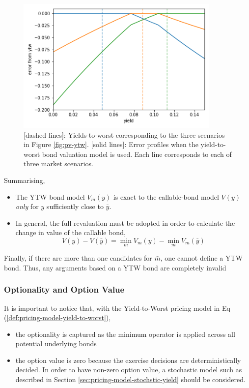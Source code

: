 \documentclass[10pt,a4paper]{article}
\begin{document}
\begin{figure}[h!]
	\begin{center}
		\includegraphics[width=10cm]{pics/error-profile-ytw.png}
	\end{center}
	\caption{
		[dashed lines]: Yields-to-worst corresponding to the three scenarios in Figure \ref{fig:pv-ytw}. 
		[solid lines]: Error profiles when the yield-to-worst bond valuation model is used. Each line corresponds to each of three market scenarios.}
	\label{fig:error-ytw}
\end{figure}


Summarising, 
\begin{itemize}
	\item The YTW bond model $V_{\bar{m}}(y)$ is exact to the callable-bond model $V(y)$ {\em only} for $y$ sufficiently close to $\bar{y}$.
	\item In general, the full revaluation must be adopted in order to calculate the change in value of the callable bond, 
	\begin{equation}
	V(y) - V(\bar{y}) = \min_m V_m(y) - \min_m V_m(\bar{y})
	\end{equation}
\end{itemize}
Finally, if there are more than one candidates for $\bar{m}$, one cannot define a YTW bond. Thus, any arguments based on a YTW bond are completely invalid 

\subsubsection{Optionality and Option Value}

It is important to notice that, with the Yield-to-Worst pricing model in Eq (\ref{def:pricing-model-yield-to-worst}), 
\begin{itemize}
	\item the optionality is captured as the minimum operator is applied across all potential underlying bonds
	\item the option value is zero because the exercise decisions are deterministically decided. In order to have non-zero option value, a stochastic model such as described in Section \ref{sec:pricing-model-stochstic-yield} should be considered. 
\end{itemize}
\end{document}
